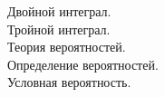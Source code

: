 \documentclass[a4paper]{article}
\begin{document}
Двойной интеграл. \\


Тройной интеграл. \\


Теория вероятностей. \\
Определение вероятностей. \\


Условная вероятность. \\

\end{document}
